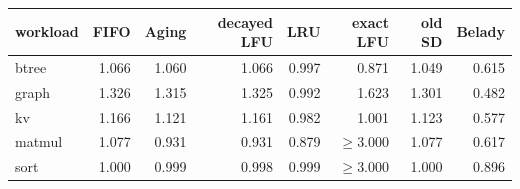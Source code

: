\begin{tabular}{lrrrrrrr}
\toprule
workload & FIFO & Aging & decayed LFU & LRU & exact LFU & old SD & Belady \\
\midrule
btree & 1.066 & 1.060 & 1.066 & 0.997 & 0.871 & 1.049 & 0.615 \\
graph & 1.326 & 1.315 & 1.325 & 0.992 & 1.623 & 1.301 & 0.482 \\
kv & 1.166 & 1.121 & 1.161 & 0.982 & 1.001 & 1.123 & 0.577 \\
matmul & 1.077 & 0.931 & 0.931 & 0.879 & $\geq$3.000 & 1.077 & 0.617 \\
sort & 1.000 & 0.999 & 0.998 & 0.999 & $\geq$3.000 & 1.000 & 0.896 \\
\bottomrule
\end{tabular}
